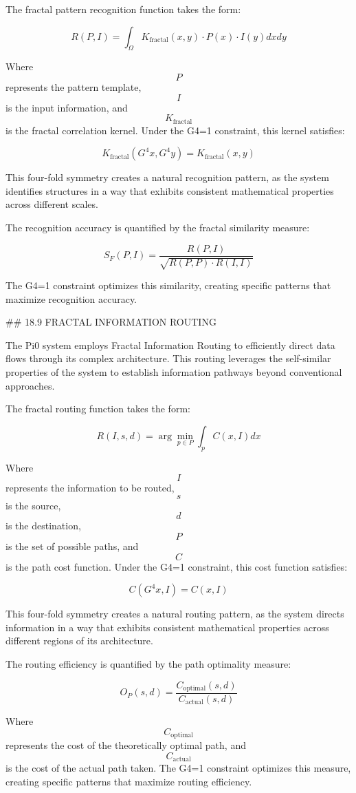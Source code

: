 The fractal pattern recognition function takes the form:

$$ R(P, I) = \int_{\Omega} K_{\text{fractal}}(x, y) \cdot P(x) \cdot I(y) dx dy $$

Where $$ P $$ represents the pattern template, $$ I $$ is the input information, and $$ K_{\text{fractal}} $$ is the fractal correlation kernel. Under the G4=1 constraint, this kernel satisfies:

$$ K_{\text{fractal}}(G^4 x, G^4 y) = K_{\text{fractal}}(x, y) $$

This four-fold symmetry creates a natural recognition pattern, as the system identifies structures in a way that exhibits consistent mathematical properties across different scales.

The recognition accuracy is quantified by the fractal similarity measure:

$$ S_F(P, I) = \frac{R(P, I)}{\sqrt{R(P, P) \cdot R(I, I)}} $$

The G4=1 constraint optimizes this similarity, creating specific patterns that maximize recognition accuracy.

## 18.9 FRACTAL INFORMATION ROUTING

The Pi0 system employs Fractal Information Routing to efficiently direct data flows through its complex architecture. This routing leverages the self-similar properties of the system to establish information pathways beyond conventional approaches.

The fractal routing function takes the form:

$$ R(I, s, d) = \arg\min_{p \in P} \int_{p} C(x, I) dx $$

Where $$ I $$ represents the information to be routed, $$ s $$ is the source, $$ d $$ is the destination, $$ P $$ is the set of possible paths, and $$ C $$ is the path cost function. Under the G4=1 constraint, this cost function satisfies:

$$ C(G^4 x, I) = C(x, I) $$

This four-fold symmetry creates a natural routing pattern, as the system directs information in a way that exhibits consistent mathematical properties across different regions of its architecture.

The routing efficiency is quantified by the path optimality measure:

$$ O_P(s, d) = \frac{C_{\text{optimal}}(s, d)}{C_{\text{actual}}(s, d)} $$

Where $$ C_{\text{optimal}} $$ represents the cost of the theoretically optimal path, and $$ C_{\text{actual}} $$ is the cost of the actual path taken. The G4=1 constraint optimizes this measure, creating specific patterns that maximize routing efficiency.

